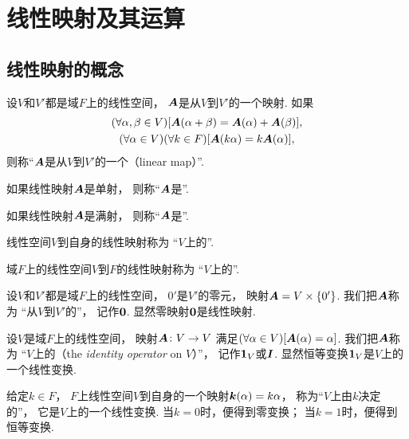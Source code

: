 \section{线性映射及其运算}
\subsection{线性映射的概念}
\begin{definition}
设\(V\)和\(V'\)都是域\(F\)上的线性空间，
\(\boldsymbol{A}\)是从\(V\)到\(V'\)的一个映射.
如果\begin{gather*}
	(\forall\alpha,\beta\in V)
	[\boldsymbol{A}(\alpha+\beta)=\boldsymbol{A}(\alpha)+\boldsymbol{A}(\beta)], \\
	(\forall\alpha\in V)
	(\forall k\in F)
	[\boldsymbol{A}(k\alpha)=k\boldsymbol{A}(\alpha)],
\end{gather*}
则称“\(\boldsymbol{A}\)是从\(V\)到\(V'\)的一个（linear map）”.
\end{definition}

如果线性映射\(\boldsymbol{A}\)是单射，
则称“\(\boldsymbol{A}\)是”.

如果线性映射\(\boldsymbol{A}\)是满射，
则称“\(\boldsymbol{A}\)是”.

线性空间\(V\)到自身的线性映射称为
“\(V\)上的”.

域\(F\)上的线性空间\(V\)到\(F\)的线性映射称为
“\(V\)上的”.

\begin{example}
设\(V\)和\(V'\)都是域\(F\)上的线性空间，
\(0'\)是\(V'\)的零元，
映射\(\boldsymbol{A}=V\times\{0'\}\).
我们把\(\boldsymbol{A}\)称为
“从\(V\)到\(V'\)的”，
记作\(\boldsymbol0\).
显然零映射\(\boldsymbol0\)是线性映射.
\end{example}

\begin{example}
设\(V\)是域\(F\)上的线性空间，
映射\(\boldsymbol{A}\colon V\to V\)
满足\((\forall\alpha\in V)[\boldsymbol{A}(\alpha)=\alpha]\).
我们把\(\boldsymbol{A}\)称为
“\(V\)上的（the \emph{identity operator} on \(V\)）”，
记作\(\boldsymbol1_V\)或\(\boldsymbol{I}\).
显然恒等变换\(\boldsymbol1_V\)是\(V\)上的一个线性变换.
\end{example}

\begin{example}
给定\(k\in F\)，
\(F\)上线性空间\(V\)到自身的一个映射\(\boldsymbol{k}(\alpha)=k\alpha\)，
称为“\(V\)上由\(k\)决定的”，
它是\(V\)上的一个线性变换.
当\(k=0\)时，便得到零变换；
当\(k=1\)时，便得到恒等变换.
\end{example}

